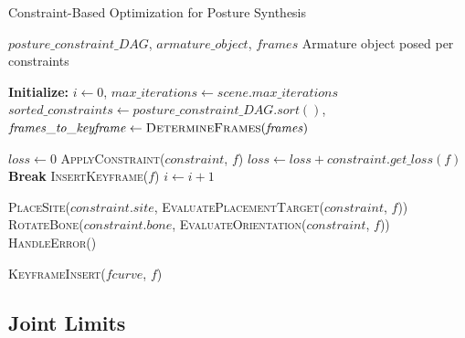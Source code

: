 \documentclass[../../main.tex]{subfiles}
\begin{document}
\begin{algorithm}
    \caption{Constraint-Based Optimization for Posture Synthesis}
    \label{alg:trimmed_optimization}
    \begin{algorithmic}[1]
        \Require $\mathit{posture\_constraint\_DAG}$, $\mathit{armature\_object}$, $\mathit{frames}$
        \Ensure Armature object posed per constraints
        
        \State \textbf{Initialize:} $i \gets 0$, $max\_iterations \gets \mathit{scene.max\_iterations}$
        \State $\mathit{sorted\_constraints} \gets \mathit{posture\_constraint\_DAG.sort()}$, $\mathit{frames\_to\_keyframe} \gets \textsc{DetermineFrames}(\mathit{frames})$
        
                \State $\mathit{loss} \gets 0$
                    \State \textsc{ApplyConstraint}($constraint$, $f$)
                    \State $\mathit{loss} \gets loss + \mathit{constraint.get\_loss(f)}$
                \EndFor
                    \State \textbf{Break}
                \EndIf
                \State \textsc{InsertKeyframe}($f$)
            \EndFor
            \State $i \gets i + 1$
        \EndWhile
        
                \State \textsc{PlaceSite}($constraint.site$, \textsc{EvaluatePlacementTarget}($constraint$, $f$))
                \State \textsc{RotateBone}($constraint.bone$, \textsc{EvaluateOrientation}($constraint$, $f$))
            \Else
                \State \textsc{HandleError}()
            \EndIf
        \EndProcedure
        
                \State \textsc{KeyframeInsert}($fcurve$, $f$)
            \EndFor
        \EndProcedure
    \end{algorithmic}
\end{algorithm}

\subsection{Joint Limits}
\label{ch:avatar_creation_pose_synthesis:proc_rig_signing_avatars:joint_limits}
\end{document}
